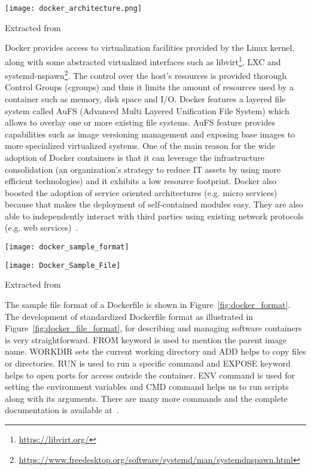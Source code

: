 \begin{center}
\texttt{[image: docker\_architecture.png]}
\label{fig:docker_architecture}
\caption*{Extracted from \cite{docker-documentation}}
\end{center}


Docker provides access to virtualization facilities provided by the Linux kernel, along with some abstracted virtualized interfaces such as libvirt\footnote{\url{https://libvirt.org/}}, LXC and systemd-nspawn\footnote{\url{https://www.freedesktop.org/software/systemd/man/systemdnspawn.html}}. The control over the host's resources is provided thorough Control Groups (cgroups) and thus it limits the amount of resources used by a container such as memory, disk space and I/O. Docker features a layered file system called AuFS (Advanced Multi Layered Unification File System) which allows to overlay one or more existing file systems. AuFS feature provides capabilities such as image versioning management and exposing base images to more specialized virtualized systems. One of the main reason for the wide adoption of Docker containers is that it can leverage the infrastructure consolidation (an organization's strategy to reduce IT assets by using more efficient technologies) and it exhibits a low resource footprint. Docker also boosted the adoption of service oriented architectures (e.g. micro services) because that makes the deployment of self-contained modules easy. They are also able to independently interact with third parties using existing network protocols (e.g. web services)~\cite{Xavier:2013:PEC:2497369.2497577}. 

\begin{center}
\texttt{[image: docker\_sample\_format]}
\label{fig:docker_format}
\end{center}

\begin{center}
\texttt{[image: Docker\_Sample\_File]}
\label{fig:docker_file_format}
\caption*{Extracted from \cite{docker-file-format}}
\end{center}

The sample file format of a Dockerfile is shown in Figure~\ref{fig:docker_format}. The development of standardized Dockerfile format as illustrated in Figure~\ref{fig:docker_file_format}, for describing and managing software containers is very straightforward. FROM keyword is used to mention the parent image name. WORKDIR sets the current working directory and ADD helps to copy files or directories. RUN is used to run a specific command and EXPOSE keyword helps to open ports for access outside the container. ENV command is used for setting the environment variables and CMD command helps us to run scripts along with its arguments. There are many more commands and the complete documentation is available at~\cite{docker_commands}.

